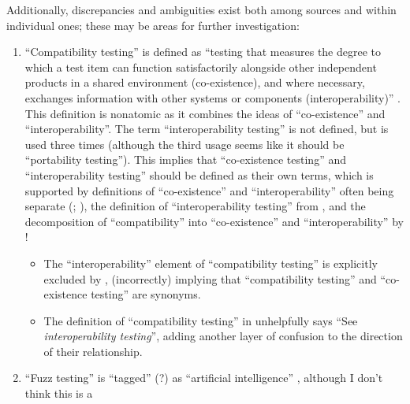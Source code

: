 Additionally, discrepancies and ambiguities exist both among sources and
within individual ones; these may be areas for further investigation:

\begin{enumerate}
      \item ``Compatibility testing'' is defined as ``testing that measures the
            degree to which a test item can function satisfactorily alongside
            other independent products in a shared environment (co-existence),
            and where necessary, exchanges information with other systems or
            components (interoperability)'' \citep[p.~3]{IEEE2022}. This
            definition is nonatomic as it combines the ideas of ``co-existence''
            and ``interoperability''. The term ``interoperability testing'' is
            not defined, but is used three times \citep[pp.~22,~43]{IEEE2022}
            (although the third usage seems like it should be ``portability
            testing''). This implies that ``co-existence testing'' and
            ``interoperability testing'' should be defined as their own terms,
            which is supported by definitions of ``co-existence'' and
            ``interoperability'' often being separate (\citealpISTQB{};
            \citealp[pp.~73,~237]{IEEE2017}), the definition of
            ``interoperability testing'' from \citet[p.~238]{IEEE2017},
            and the decomposition of ``compatibility'' into ``co-existence''
            and ``interoperability'' by \citet{ISO_IEC2023a}!
            \begin{itemize}
                  \item The ``interoperability'' element of ``compatibility
                        testing'' is explicitly excluded by
                        \citet[p.~37]{IEEE2021}, (incorrectly) implying that
                        ``compatibility testing'' and ``co-existence testing''
                        are synonyms.
                  \item The definition of ``compatibility testing'' in
                        \citep[p.~43]{Kam2008} unhelpfully says ``See
                        \emph{interoperability testing}'', adding another
                        layer of confusion to the direction of their
                        relationship.
            \end{itemize}
      \item ``Fuzz testing'' is ``tagged'' (?) as ``artificial intelligence''
            \citep[p.~5]{IEEE2022}, although I don't think this is a

\end{enumerate}
